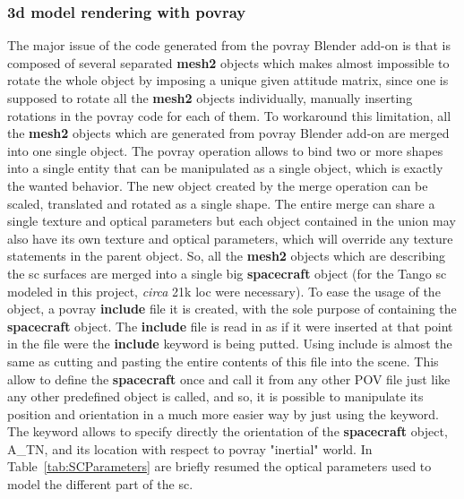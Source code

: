 \subsubsection{\acrshort{3d} model rendering with \acrshort{povray}}
The major issue of the code generated from the  \acrshort{povray} Blender add-on is that is composed of several separated \textbf{mesh2} objects which makes almost impossible to rotate the whole object by imposing a unique given attitude matrix, since one is supposed to rotate all the \textbf{mesh2} objects individually, manually inserting rotations in the \acrshort{povray} code for each of them.
To workaround this limitation, all the \textbf{mesh2} objects which are generated from \acrshort{povray} Blender add-on are merged into one single  object.
The  \acrshort{povray} operation allows to bind two or more shapes into a single entity that can be manipulated as a single object, which is exactly the wanted behavior. The new object created by the merge operation can be scaled, translated and rotated as a single shape. The entire merge can share a single texture and optical parameters but each object contained in the union may also have its own texture and optical parameters, which will override any texture statements in the parent object. So, all the \textbf{mesh2} objects which are describing the \acrshort{sc} surfaces are merged into a single big \textbf{spacecraft}  object (for the Tango \acrshort{sc} modeled in this project, \textit{circa} 21k \acrshort{loc} were necessary).
To ease the usage of the  object, a \acrshort{povray} \textbf{include} file it is created, with the sole purpose of containing the \textbf{spacecraft}  object.
The \textbf{include} file is read in as if it were inserted at that point in the file were the \textbf{include} keyword is being putted. Using include is almost the same as cutting and pasting the entire contents of this file into the scene. This allow to define the \textbf{spacecraft}  once and call it from any other POV file just like any other predefined object is called, and so, it is possible to manipulate its position and orientation in a much more easier way by just using the  keyword. The  keyword  allows to specify directly the orientation of the \textbf{spacecraft} object, \gls{A_TN}, and its location with respect to \acrshort{povray} "inertial" world.
In Table~\ref{tab:SCParameters} are briefly resumed the optical parameters used to model the different part of the \acrshort{sc}.

